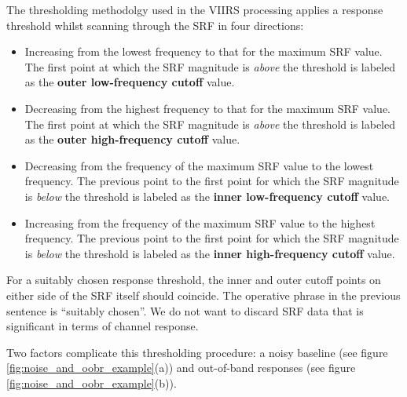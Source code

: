 The thresholding methodolgy used in the VIIRS processing applies a response threshold whilst scanning through the SRF in four directions:
\begin{itemize}
  \item Increasing from the lowest frequency to that for the maximum SRF value. The first point at which the SRF magnitude is \emph{above} the threshold is labeled as the \textbf{outer low-frequency cutoff} value.
  \item Decreasing from the highest frequency to that for the maximum SRF value. The first point at which the SRF magnitude is \emph{above} the threshold is labeled as the \textbf{outer high-frequency cutoff} value.
  \item Decreasing from the frequency of the maximum SRF value to the lowest frequency. The previous point to the first point for which the SRF magnitude is \emph{below} the threshold is labeled as the \textbf{inner low-frequency cutoff} value.
  \item Increasing from the frequency of the maximum SRF value to the highest frequency. The previous point to the first point for which the SRF magnitude is \emph{below} the threshold is labeled as the \textbf{inner high-frequency cutoff} value.
\end{itemize}
For a suitably chosen response threshold, the inner and outer cutoff points on either side of the SRF itself should coincide. The operative phrase in the previous sentence is ``suitably chosen''. We do not want to discard SRF data that is significant in terms of channel response.

Two factors complicate this thresholding procedure: a noisy baseline (see figure \ref{fig:noise_and_oobr_example}(a)) and out-of-band responses (see figure \ref{fig:noise_and_oobr_example}(b)).
  
